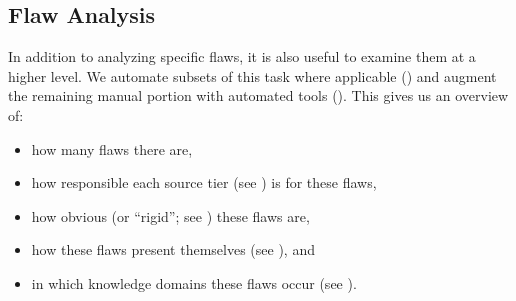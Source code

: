 \subsection{Flaw Analysis}
\label{flaw-analysis}

In addition to analyzing specific flaws, it is also useful to examine them at
a higher level. We automate subsets of this task where applicable
() and augment the remaining manual portion with
automated tools (). This gives us an overview of:
\begin{itemize}
    \item how many flaws there are,
    \item how responsible each source tier (see ) is for these flaws,
    \item how obvious (or ``rigid''; see ) these flaws are,
    \item how these flaws present themselves (see ), and
    \item in which knowledge domains these flaws occur (see ).
\end{itemize}


